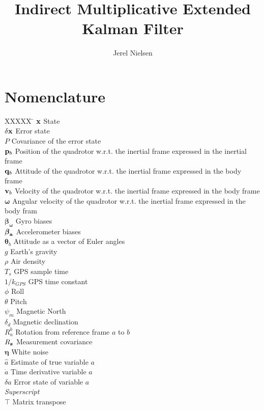 \documentclass[english]{article}
\begin{document}
\title{Indirect Multiplicative Extended Kalman Filter}

\author{Jerel Nielsen}
\maketitle



\section{Nomenclature}

\begin{tabbing}
	XXXXX \= \kill%
	$\bf{x}$ \> State \\
	$\delta {\bf x}$ \> Error state \\
	$P$ \> Covariance of the error state \\
	${\bf{p}}_b$ \> Position of the quadrotor w.r.t. the inertial frame expressed in the inertial frame \\
	${\bf{q}}_b$ \> Attitude of the quadrotor w.r.t. the inertial frame expressed in the body frame \\
	${\bf{v}}_b$ \> Velocity of the quadrotor w.r.t. the inertial frame expressed in the body frame \\
	$\boldsymbol{\omega}$ \> Angular velocity of the quadrotor w.r.t. the inertial frame expressed in the body fram \\
	$\boldsymbol{\beta}_{\boldsymbol{\omega}}$ \> Gyro biases \\
	$\boldsymbol{\beta}_{\bf{a}}$ \> Accelerometer biases \\
	$\boldsymbol{\theta}_b$ \> Attitude as a vector of Euler angles \\
	$g$ \> Earth's gravity \\
	$\rho$ \> Air density \\
	$T_s$ \> GPS sample time \\
	$1/k_{GPS}$ \> GPS time constant \\
	$\phi$ \> Roll \\
	$\theta$ \> Pitch \\
	$\psi_m$ \> Magnetic North \\
	$\delta_d$ \> Magnetic declination \\
	$R_a^b$ \> Rotation from reference frame $a$ to $b$ \\
	$R_{\bf z}$ \> Measurement covariance \\
	$\boldsymbol{\eta}$ \> White noise \\
	$\hat{a}$ \> Estimate of true variable $a$ \\
	$\dot{a}$ \> Time derivative variable $a$ \\
	$\delta a$ \> Error state of variable $a$ \\
	[5pt]
	\textit{Superscript}\\
	$\top$ \> Matrix transpose \\
\end{tabbing}
\end{document}

